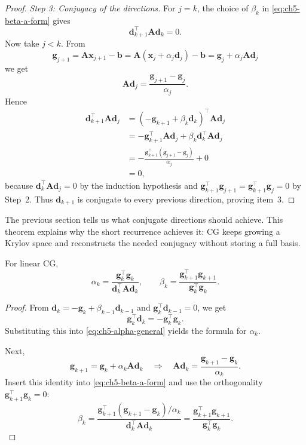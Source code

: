 \begin{proof}
\emph{Step 3: Conjugacy of the directions.}
For $j=k$, the choice of $\beta_k$ in \eqref{eq:ch5-beta-a-form} gives
\[
  \mathbf{d}_{k+1}^{\top}\mathbf{A}\mathbf{d}_k=0.
\]
Now take $j<k$. From
\[
  \mathbf{g}_{j+1}
  =\mathbf{A}\mathbf{x}_{j+1}-\mathbf{b}
  =\mathbf{A}(\mathbf{x}_j+\alpha_j \mathbf{d}_j)-\mathbf{b}
  =\mathbf{g}_j+\alpha_j \mathbf{A}\mathbf{d}_j
\]
we get
\[
  \mathbf{A}\mathbf{d}_j=\frac{\mathbf{g}_{j+1}-\mathbf{g}_j}{\alpha_j}.
\]
Hence
\begin{align*}
  \mathbf{d}_{k+1}^{\top}\mathbf{A}\mathbf{d}_j
  &=(-\mathbf{g}_{k+1}+\beta_k \mathbf{d}_k)^{\top}\mathbf{A}\mathbf{d}_j \\
  &=-\mathbf{g}_{k+1}^{\top}\mathbf{A}\mathbf{d}_j
  +\beta_k \mathbf{d}_k^{\top}\mathbf{A}\mathbf{d}_j \\
  &=-\frac{\mathbf{g}_{k+1}^{\top}(\mathbf{g}_{j+1}-\mathbf{g}_j)}{\alpha_j}
  +0 \\
  &=0,
\end{align*}
because $\mathbf{d}_k^{\top}\mathbf{A}\mathbf{d}_j=0$ by the induction
hypothesis and
$\mathbf{g}_{k+1}^{\top}\mathbf{g}_{j+1}
=\mathbf{g}_{k+1}^{\top}\mathbf{g}_j=0$ by Step~2. Thus
$\mathbf{d}_{k+1}$ is conjugate to every previous direction, proving item~3.
\end{proof}

The previous section tells us what conjugate directions should achieve. This
theorem explains why the short recurrence achieves it: CG keeps growing a
Krylov space and reconstructs the needed conjugacy without storing a full
basis.

\begin{claim}
\label{clm:ch5-practical-alpha-beta}
For linear CG,
\begin{equation}
  \label{eq:ch5-alpha-cg}
  \alpha_k=\frac{\mathbf{g}_k^{\top}\mathbf{g}_k}
  {\mathbf{d}_k^{\top}\mathbf{A}\mathbf{d}_k},
  \qquad
  \beta_k=\frac{\mathbf{g}_{k+1}^{\top}\mathbf{g}_{k+1}}
  {\mathbf{g}_k^{\top}\mathbf{g}_k}.
\end{equation}
\end{claim}
\begin{proof}
From
$\mathbf{d}_k=-\mathbf{g}_k+\beta_{k-1}\mathbf{d}_{k-1}$ and
$\mathbf{g}_k^{\top}\mathbf{d}_{k-1}=0$, we get
\[
  \mathbf{g}_k^{\top}\mathbf{d}_k=-\mathbf{g}_k^{\top}\mathbf{g}_k.
\]
Substituting this into \eqref{eq:ch5-alpha-general} yields the formula for
$\alpha_k$.

Next,
\[
  \mathbf{g}_{k+1}=\mathbf{g}_k+\alpha_k \mathbf{A}\mathbf{d}_k
  \quad \Longrightarrow \quad
  \mathbf{A}\mathbf{d}_k=\frac{\mathbf{g}_{k+1}-\mathbf{g}_k}{\alpha_k}.
\]
Insert this identity into \eqref{eq:ch5-beta-a-form} and use the orthogonality
$\mathbf{g}_{k+1}^{\top}\mathbf{g}_k=0$:
\[
  \beta_k
  =\frac{\mathbf{g}_{k+1}^{\top}(\mathbf{g}_{k+1}-\mathbf{g}_k)/\alpha_k}
  {\mathbf{d}_k^{\top}\mathbf{A}\mathbf{d}_k}
  =\frac{\mathbf{g}_{k+1}^{\top}\mathbf{g}_{k+1}}
  {\mathbf{g}_k^{\top}\mathbf{g}_k}.
\]
\end{proof}

